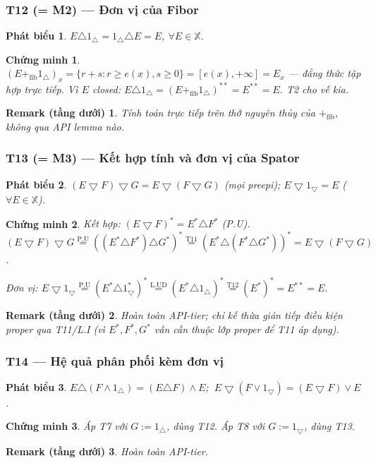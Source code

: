 \documentclass[11pt]{article}
\theoremstyle{plainlabel}
\newtheorem*{phatbieu}{Phát biểu}
\newtheorem*{chungminh}{Chứng minh}
\newtheorem*{remarkbox}{Remark (tầng dưới)}
\begin{document}
\subsubsection*{T12 (= M2) --- Đơn vị của Fibor}
\begin{phatbieu} $E\triangle1_\triangle=1_\triangle\triangle E=E$, $\forall E\in\mathbb X$. \end{phatbieu}
\begin{chungminh} $(E+_{\mathrm{fib}}1_\triangle)_x=\{r+s:r\ge e(x),s\ge0\}=[e(x),+\infty]=E_x$ — đẳng thức tập hợp trực tiếp. Vì $E$ closed: $E\triangle1_\triangle=(E+_{\mathrm{fib}}1_\triangle)^{**}=E^{**}=E$. T2 cho vế kia. \end{chungminh}
\begin{remarkbox} Tính toán trực tiếp trên thớ nguyên thủy của $+_{\mathrm{fib}}$, không qua API lemma nào. \end{remarkbox}

\subsubsection*{T13 (= M3) --- Kết hợp tính và đơn vị của Spator}
\begin{phatbieu} $(E\bigtriangledown F)\bigtriangledown G=E\bigtriangledown(F\bigtriangledown G)$ (mọi preepi); $E\bigtriangledown1_{\bigtriangledown}=E$ ($\forall E\in\mathbb X$). \end{phatbieu}
\begin{chungminh}
Kết hợp: $(E\bigtriangledown F)^*=E^*\triangle F^*$ (P.U). $(E\bigtriangledown F)\bigtriangledown G\overset{\text{P.U}}=((E^*\triangle F^*)\triangle G^*)^*\overset{\text{T11}}=(E^*\triangle(F^*\triangle G^*))^*=E\bigtriangledown(F\bigtriangledown G)$.

Đơn vị: $E\bigtriangledown1_{\bigtriangledown}\overset{\text{P.U}}=(E^*\triangle1_{\bigtriangledown}^*)^*\overset{\text{L.UD}}=(E^*\triangle1_\triangle)^*\overset{\text{T12}}=(E^*)^*=E^{**}=E$.
\end{chungminh}
\begin{remarkbox} Hoàn toàn API-tier; chỉ kế thừa gián tiếp điều kiện proper qua T11/L.I (vì $E^*,F^*,G^*$ vẫn cần thuộc lớp proper để T11 áp dụng). \end{remarkbox}

\subsubsection*{T14 --- Hệ quả phân phối kèm đơn vị}
\begin{phatbieu} $E\triangle(F\wedge1_\triangle)=(E\triangle F)\wedge E$; $\ E\bigtriangledown(F\vee1_{\bigtriangledown})=(E\bigtriangledown F)\vee E$. \end{phatbieu}
\begin{chungminh} Áp T7 với $G:=1_\triangle$, dùng T12. Áp T8 với $G:=1_{\bigtriangledown}$, dùng T13. \end{chungminh}
\begin{remarkbox} Hoàn toàn API-tier. \end{remarkbox}
\end{document}
